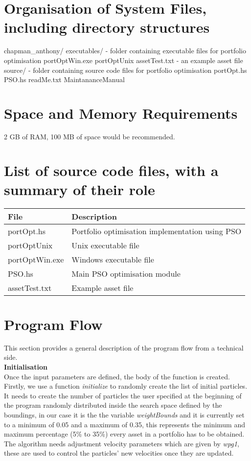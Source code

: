 \documentclass[]{report}
\begin{document}
\section*{Organisation of System Files, including directory structures} 
  \begin{code}
    chapman_anthony/
        executables/ - folder containing executable files for portfolio optimisation 
            portOptWin.exe
            portOptUnix
            assetTest.txt - an example asset file
        source/ - folder containing source code files for portfolio optimisation
            portOpt.hs
            PSO.hs
        readMe.txt
        MaintananceManual
  \end{code}

\section*{Space and Memory Requirements}
  2 GB of RAM, 100 MB of space would be recommended.

\section*{List of source code files, with a summary of their role}
  \begin{tabular}{|l|l|}
    \hline
    File & Description \\
    \hline
    portOpt.hs & Portfolio optimisation implementation using PSO \\
    \hline
    portOptUnix & Unix executable file \\
    \hline
    portOptWin.exe & Windows executable file \\
    \hline
    PSO.hs & Main PSO optimisation module \\
    \hline
    assetTest.txt & Example asset file \\
    \hline
  \end{tabular}

\section*{Program Flow} 
  This section provides a general description of the program flow from a technical side. \\
  \textbf{Initialisation} \\
  Once the input parameters are defined, the body of the function is created. Firstly, we use a function \textit{initialize} to randomly create the list of initial particles. It needs to create the number of particles the user specified at the beginning of the program randomly distributed inside the search space defined by the boundings, in our case it is the the variable \textit{weightBounds} and it is currently set to a minimum of 0.05 and a maximum of 0.35, this represents the minimum and maximum percentage (5\% to 35\%) every asset in a portfolio has to be obtained. The algorithm needs adjustment velocity parameters which are given by \textit{wpg1}, these are used to control the particles' new velocities once they are updated. 
\end{document}
